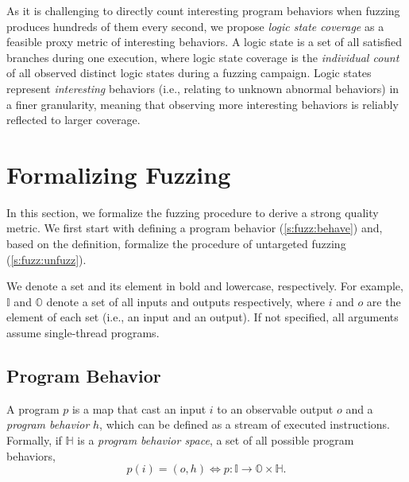 \documentclass[letterpaper,twocolumn,10pt]{article}
\begin{document}
As it is challenging to directly count interesting program behaviors when
fuzzing produces hundreds of them every second, we propose \emph{logic state
coverage} as a feasible proxy metric of interesting behaviors. A logic state is
a set of all satisfied branches during one execution, where logic state coverage
is the \emph{individual count} of all observed distinct logic states during a
fuzzing campaign. Logic states represent \emph{interesting} behaviors (i.e.,
relating to unknown abnormal behaviors) in a finer granularity, meaning that
observing more interesting behaviors is reliably reflected to larger coverage. 



\section{Formalizing Fuzzing}

In this section, we formalize the fuzzing procedure to derive a strong quality
metric. We first start with defining a program
behavior (\autoref{s:fuzz:behave}) and, based on the definition, formalize the
procedure of untargeted fuzzing (\autoref{s:fuzz:unfuzz}).

%
We denote a set and its element in bold and lowercase, respectively.  For
example, $\mathbb{I}$ and $\mathbb{O}$ denote a set of all inputs and outputs
respectively, where $i$ and $o$ are the element of each set (i.e., an input and
an output). If not specified, all arguments assume single-thread programs.

\subsection{Program Behavior}
\label{s:fuzz:behave}


A program $p$ is a map that cast an input $i$ to an observable output $o$ and
a \emph{program behavior} $h$, which can be defined as a stream of executed
instructions. Formally, if $\mathbb{H}$ is a \emph{program behavior space}, 
a set of all possible program behaviors,
%
\begin{equation}
  p(i) = (o, h) \iff p: \mathbb{I} \rightarrow \mathbb{O} \times \mathbb{H}.
\end{equation}
\end{document}
